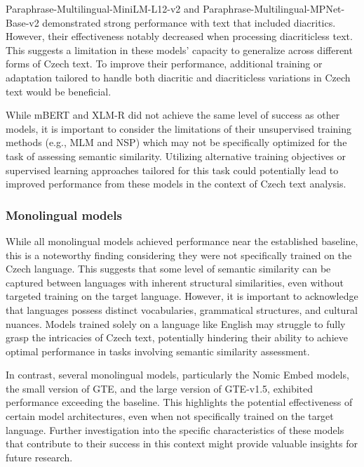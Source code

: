 Paraphrase-Multilingual-MiniLM-L12-v2 and Paraphrase-Multilingual-MPNet-Base-v2 demonstrated strong performance with text that included diacritics.
However, their effectiveness notably decreased when processing diacriticless text.
This suggests a limitation in these models' capacity to generalize across different forms of Czech text.
To improve their performance, additional training or adaptation tailored to handle both diacritic and diacriticless variations in Czech text would be beneficial.

While \ac{mBERT} and \ac{XLM-R} did not achieve the same level of success as other models, it is important to consider the limitations of their unsupervised training methods (e.g., \ac{MLM} and \ac{NSP}) which may not be specifically optimized for the task of assessing semantic similarity.
Utilizing alternative training objectives or supervised learning approaches tailored for this task could potentially lead to improved performance from these models in the context of Czech text analysis.

\subsubsection{Monolingual models}

While all monolingual models achieved performance near the established baseline, this is a noteworthy finding considering they were not specifically trained on the Czech language.
This suggests that some level of semantic similarity can be captured between languages with inherent structural similarities, even without targeted training on the target language.
However, it is important to acknowledge that languages possess distinct vocabularies, grammatical structures, and cultural nuances.
Models trained solely on a language like English may struggle to fully grasp the intricacies of Czech text, potentially hindering their ability to achieve optimal performance in tasks involving semantic similarity assessment.

In contrast, several monolingual models, particularly the Nomic Embed models, the small version of GTE, and the large version of GTE-v1.5, exhibited performance exceeding the baseline.
This highlights the potential effectiveness of certain model architectures, even when not specifically trained on the target language.
Further investigation into the specific characteristics of these models that contribute to their success in this context might provide valuable insights for future research.

